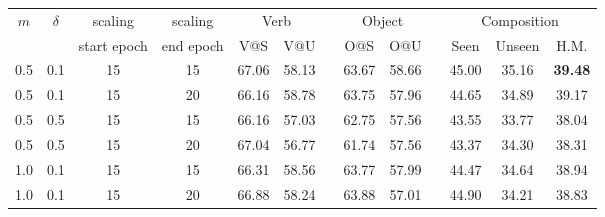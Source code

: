 \begin{table}[t]
{{\begin{tabular}{cc cc cc c cc c ccc}
\multirow{2}{*}{$m$} & \multirow{2}{*}{$\delta$} & scaling & scaling & \multicolumn{2}{c}{Verb} && \multicolumn{2}{c}{Object} && \multicolumn{3}{c}{Composition} \\ 
\cline{5-6} \cline{8-9} \cline{11-13} 
&& start epoch & end epoch & V@S & V@U && O@S & O@U && Seen & Unseen & H.M. \\
\midrule
0.5 & 0.1 & 15 & 15 & 67.06 & 58.13 && 63.67 & 58.66 && 45.00 & 35.16 & \textbf{39.48} \\
0.5 & 0.1 & 15 & 20 & 66.16 & 58.78 && 63.75 & 57.96 && 44.65 & 34.89 & 39.17 \\
0.5 & 0.5 & 15 & 15 & 66.16 & 57.03 && 62.75 & 57.56 && 43.55 & 33.77 & 38.04 \\
0.5 & 0.5 & 15 & 20 & 67.04 & 56.77 && 61.74 & 57.56 && 43.37 & 34.30 & 38.31 \\
1.0 & 0.1 & 15 & 15 & 66.31 & 58.56 && 63.77 & 57.99 && 44.47 & 34.64 & 38.94 \\
1.0 & 0.1 & 15 & 20 & 66.88 & 58.24 && 63.88 & 57.01 && 44.90 & 34.21 & 38.83 \\
\bottomrule
\end{tabular}
}
}

\label{tab:supple_additional_ablation}
\end{table}
